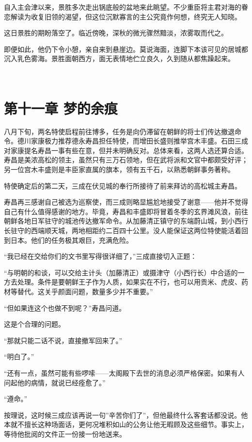 \documentclass[
]{book}
\begin{document}
自入主会津以来，景胜多次走出锅底般的盆地来此眺望。不少重臣将主君对海的眷恋解读为收复旧领的渴望，但这位沉默寡言的主公究竟作何想，终究无人知晓。

这日景胜的期盼落空了。临近傍晚，深秋的微光骤然黯淡，浓雾取而代之。

即便如此，他仍下令小憩，亲自来到悬崖边。莫说海面，连脚下本该可见的居城都沉入乳色雾海。景胜面朝西方，面无表情地伫立良久，久到随从都焦躁起来。

  

\chapter*{第十一章 梦的余痕}\label{ux7b2cux5341ux4e00ux7ae0-ux68a6ux7684ux4f59ux75d5}

八月下旬，两名特使启程前往博多，任务是向仍滞留在朝鲜的将士们传达撤退命令。德川家康极力推荐德永寿昌担任特使，而增田长盛则推举宫木丰盛。石田三成对家康提名寿昌一事有些在意，但并未明确反对。总体来看，这两人选还算合适。寿昌是美浓高松的领主，虽然只有三万石领地，但在武将派和文官中都颇受好评；另一位宫木丰盛则是丰臣家直属的旗本，领有五千石，以熟悉朝鲜事务著称。

特使确定后的第二天，三成在伏见城的奉行所接待了前来拜访的高松城主寿昌。

寿昌再三感谢自己被选为巡察使，而三成则略显尴尬地接受了谢意------他并不觉得自己有什么值得感谢的地方。毕竟，寿昌和丰盛即将冒着冬季的玄界滩风浪，前往朝鲜各地日军驻守的城池传达撤军命令。从加藤清正镇守的东端蔚山城，到小西行长驻守的西端顺天城，两地相距约二百四十公里。没人能保证这两位特使能活着回到日本。他们的任务极其艰巨，充满危险。

``我已经在交给你们的文书里写得很详细了，''三成直接切入正题：

``与明朝的和谈，可以交给主计头（加藤清正）或摄津守（小西行长）中合适的一方去处理。条件是要朝鲜王子作为人质，如果实在不行，也可以用贡米、虎皮、药材等替代。这关乎颜面问题，数量多少并不重要。''

``但如果连这个也做不到呢？''寿昌问道。

这是个合理的问题。

``那就只能二话不说，直接撤军回来了。''

``明白了。''

``还有一点，虽然可能有些啰嗦------太阁殿下去世的消息必须严格保密。如果有人问起他的病情，就说已经痊愈了。''

``遵命。''

按理说，这时候三成应该再说一句''辛苦你们了''，但他最终什么客套话都没说。他本就不擅长这种场面话，更何况堆积如山的公务让他无暇顾及这些细节。事实上，等待他批阅的文件正一份接一份地送来。
\end{document}
